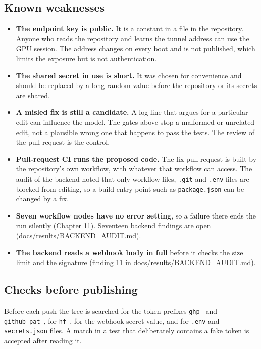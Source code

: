 \subsection{Known weaknesses}

\begin{itemize}[leftmargin=*, itemsep=2pt]
\item \textbf{The endpoint key is public.} It is a constant in a file in the repository. Anyone who reads the repository and learns the tunnel address can use the GPU session. The address changes on every boot and is not published, which limits the exposure but is not authentication.
\item \textbf{The shared secret in use is short.} It was chosen for convenience and should be replaced by a long random value before the repository or its secrets are shared.
\item \textbf{A misled fix is still a candidate.} A log line that argues for a particular edit can influence the model. The gates above stop a malformed or unrelated edit, not a plausible wrong one that happens to pass the tests. The review of the pull request is the control.
\item \textbf{Pull-request CI runs the proposed code.} The fix pull request is built by the repository's own workflow, with whatever that workflow can access. The audit of the backend noted that only workflow files, \texttt{.\allowbreak{}git} and \texttt{.\allowbreak{}env} files are blocked from editing, so a build entry point such as \texttt{package.\allowbreak{}json} can be changed by a fix.
\item \textbf{Seven workflow nodes have no error setting}, so a failure there ends the run silently (Chapter 11). Seventeen backend findings are open (docs/\allowbreak{}results/\allowbreak{}BACKEND\_\allowbreak{}AUDIT.md).
\item \textbf{The backend reads a webhook body in full} before it checks the size limit and the signature (finding 11 in docs/\allowbreak{}results/\allowbreak{}BACKEND\_\allowbreak{}AUDIT.md).
\end{itemize}

\subsection{Checks before publishing}

Before each push the tree is searched for the token prefixes \texttt{ghp\_\allowbreak{}} and \texttt{github\_\allowbreak{}pat\_\allowbreak{}}, for \texttt{hf\_\allowbreak{}}, for the webhook secret value, and for \texttt{.\allowbreak{}env} and \texttt{secrets.\allowbreak{}json} files. A match in a test that deliberately contains a fake token is accepted after reading it.

